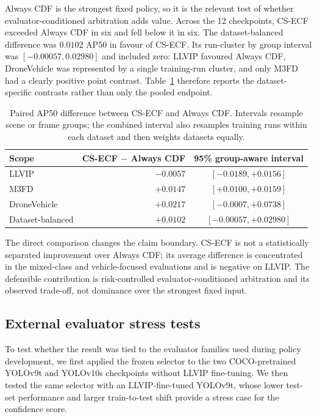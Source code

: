 \documentclass[preprint,11pt]{elsarticle}
\begin{document}
Always CDF is the strongest fixed policy, so it is the relevant test of whether
evaluator-conditioned arbitration adds value. Across the 12 checkpoints, CS-ECF
exceeded Always CDF in six and fell below it in six. The dataset-balanced
difference was \(0.0102\) AP50 in favour of CS-ECF. Its run-cluster by group
interval was \([-0.00057,0.02980]\) and included zero: LLVIP favoured Always
CDF, DroneVehicle was represented by a single training-run cluster, and only
M3FD had a clearly positive point contrast. Table~\ref{tab:cdf-paired} therefore
reports the dataset-specific contrasts rather than only the pooled endpoint.

\begin{table}[t]
\centering
\small
\caption{Paired AP50 difference between CS-ECF and Always CDF. Intervals
resample scene or frame groups; the combined interval also resamples training
runs within each dataset and then weights datasets equally.}
\label{tab:cdf-paired}
\begin{tabular}{@{}lrc@{}}
\toprule
Scope & CS-ECF \(-\) Always CDF & 95\% group-aware interval \\
\midrule
LLVIP & \(-0.0057\) & \([-0.0189,+0.0156]\) \\
M3FD & \(+0.0147\) & \([+0.0100,+0.0159]\) \\
DroneVehicle & \(+0.0217\) & \([-0.0007,+0.0738]\) \\
Dataset-balanced & \(+0.0102\) & \([-0.00057,+0.02980]\) \\
\bottomrule
\end{tabular}
\end{table}

The direct comparison changes the claim boundary. CS-ECF is not a statistically
separated improvement over Always CDF; its average difference is concentrated
in the mixed-class and vehicle-focused evaluations and is negative on LLVIP.
The defensible contribution is risk-controlled evaluator-conditioned
arbitration and its observed trade-off, not dominance over the strongest fixed
input.

\subsection{External evaluator stress tests}

To test whether the result was tied to the evaluator families used during
policy development, we first applied the frozen selector to the two
COCO-pretrained YOLOv9t and YOLOv10s checkpoints without LLVIP fine-tuning.
We then tested the same selector with an LLVIP-fine-tuned YOLOv9t, whose lower
test-set performance and larger train-to-test shift provide a stress case for
the confidence score.
\end{document}
